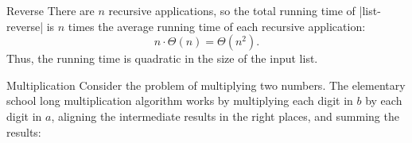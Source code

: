 \begin{schemeregion}
\begin{examplenobar}{Reverse}
There are $n$ recursive applications, so the total running time of \scheme|list-reverse| is $n$ times the average running time of each recursive application: \[n \cdot \Theta(n) = \Theta(n^2).\]  Thus, the running time is quadratic in the size of the input list.
\end{examplenobar}

\begin{examplenobar}{Multiplication} Consider the problem of multiplying two numbers.  The elementary school long multiplication algorithm works by multiplying each digit in $b$ by each digit in $a$, aligning the intermediate results in the right places, and summing the results:



\end{examplenobar}
\end{schemeregion}
